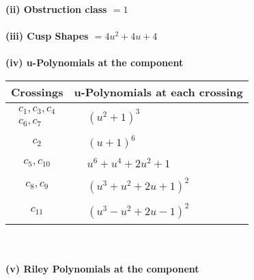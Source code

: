 \documentclass[1p]{elsarticle_modified}
\theoremstyle{definition}
\begin{document}
\flushleft \textbf{(ii) Obstruction class $= 1$}\\~\\
\flushleft \textbf{(iii) Cusp Shapes $= 4 u^2+4 u+4$}\\~\\
\newpage\renewcommand{\arraystretch}{1}
\flushleft \textbf{(iv) u-Polynomials at the component}\newline \\
\begin{tabular}{m{50pt}|m{274pt}}
Crossings & \hspace{64pt}u-Polynomials at each crossing \\
\hline $$\begin{aligned}c_{1},c_{3},c_{4}\\c_{6},c_{7}\end{aligned}$$&$\begin{aligned}
&(u^2+1)^3
\end{aligned}$\\
\hline $$\begin{aligned}c_{2}\end{aligned}$$&$\begin{aligned}
&(u+1)^6
\end{aligned}$\\
\hline $$\begin{aligned}c_{5},c_{10}\end{aligned}$$&$\begin{aligned}
&u^6+u^4+2 u^2+1
\end{aligned}$\\
\hline $$\begin{aligned}c_{8},c_{9}\end{aligned}$$&$\begin{aligned}
&(u^3+u^2+2 u+1)^2
\end{aligned}$\\
\hline $$\begin{aligned}c_{11}\end{aligned}$$&$\begin{aligned}
&(u^3- u^2+2 u-1)^2
\end{aligned}$\\
\hline
\end{tabular}\\~\\
\newpage\renewcommand{\arraystretch}{1}
\flushleft \textbf{(v) Riley Polynomials at the component}\newline \\
\end{document}
